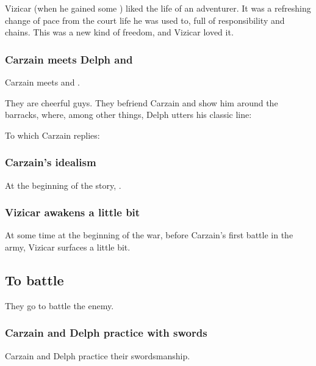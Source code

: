 Vizicar (when he gained some \kenosis) liked the life of an adventurer. 
It was a refreshing change of pace from the court life he was used to, full of responsibility and chains. 
This was a new kind of freedom, and Vizicar loved it. 





\subsubsection[Carzain meets Delph and Tsekkect]{Carzain meets Delph and \Tsekkect}
Carzain meets  and .

They are cheerful guys. 
They befriend Carzain and show him around the barracks, where, among other things, Delph utters his classic line: 

To which Carzain replies: 






\subsubsection{Carzain's idealism}
At the beginning of the story, .





\subsubsection{Vizicar awakens a little bit}
At some time at the beginning of the war, before Carzain's first battle in the army, Vizicar surfaces a little bit. 









\subsection{To battle}
They go to battle the enemy. 





\subsubsection{Carzain and Delph practice with swords}
Carzain and Delph practice their swordsmanship. 

